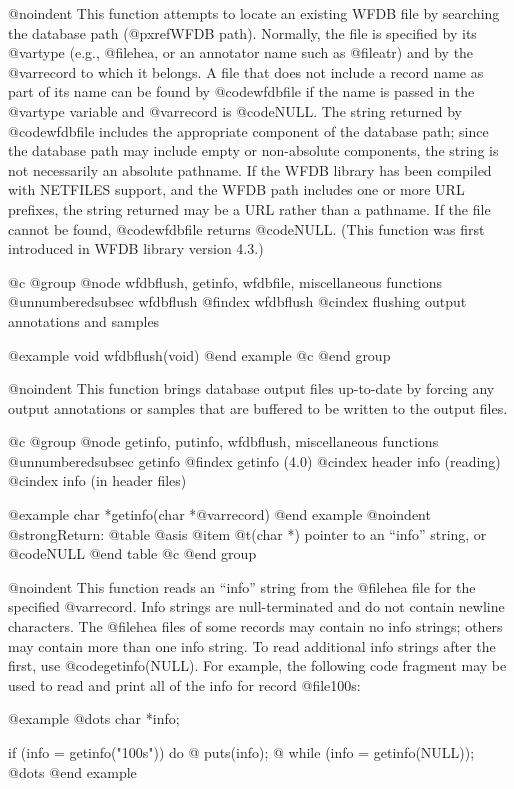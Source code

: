 {{{{{{{{{{@noindent
This function attempts to locate an existing WFDB file by searching the
database path (@pxref{WFDB path}).  Normally, the file is specified by its
@var{type} (e.g., @file{hea}, or an annotator name such as @file{atr})
and by the @var{record} to which it belongs.  A file that does not include a
record name as part of its name can be found by @code{wfdbfile} if the name is
passed in the @var{type} variable and @var{record} is @code{NULL}.  The string
returned by @code{wfdbfile} includes the appropriate component of the database
path; since the database path may include empty or non-absolute components, the
string is not necessarily an absolute pathname.  If the WFDB library has been
compiled with NETFILES support, and the WFDB path includes one or more
URL prefixes, the string returned may be a URL rather than a pathname.  If the
file cannot be found, @code{wfdbfile} returns @code{NULL}.  (This function was
first introduced in WFDB library version 4.3.)

@c @group
@node     wfdbflush, getinfo, wfdbfile, miscellaneous functions
@unnumberedsubsec wfdbflush
@findex wfdbflush
@cindex flushing output annotations and samples

@example
void wfdbflush(void)
@end example
@c @end group

@noindent
This function brings database output files up-to-date by forcing any
output annotations or samples that are buffered to be written to the
output files.

@c @group
@node     getinfo, putinfo, wfdbflush, miscellaneous functions
@unnumberedsubsec getinfo
@findex getinfo (4.0)
@cindex header info (reading) 
@cindex info (in header files)

@example
char *getinfo(char *@var{record})
@end example
@noindent
@strong{Return:}
@table @asis
@item @t{(char *)}
pointer to an ``info'' string, or @code{NULL}
@end table
@c @end group

@noindent
This function reads an ``info'' string from the @file{hea} file for
the specified @var{record}.  Info strings are null-terminated and do not
contain newline characters.  The @file{hea} files of some records may
contain no info strings;  others may contain more than one info string.
To read additional info strings after the first, use @code{getinfo(NULL)}.
For example, the following code fragment may be used to read and print
all of the info for record @file{100s}:

@example
@dots{}
char *info;

if (info = getinfo("100s"))
    do @{
        puts(info);
    @} while (info = getinfo(NULL));
@dots{}
@end example

}}}}}}}}}}
